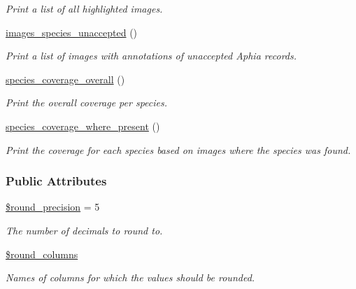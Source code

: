 \begin{DoxyCompactItemize}
\begin{DoxyCompactList}\small\item\em Print a list of all highlighted images. \end{DoxyCompactList}\item 
\hypertarget{classDataTable_a133de329decd44c977d5142ef1595803}{\hyperlink{classDataTable_a133de329decd44c977d5142ef1595803}{images\-\_\-species\-\_\-unaccepted} ()}\label{classDataTable_a133de329decd44c977d5142ef1595803}

\begin{DoxyCompactList}\small\item\em Print a list of images with annotations of unaccepted Aphia records. \end{DoxyCompactList}\item 
\hyperlink{classDataTable_a6cc56465dab08d3ee3056e8194763c59}{species\-\_\-coverage\-\_\-overall} ()
\begin{DoxyCompactList}\small\item\em Print the overall coverage per species. \end{DoxyCompactList}\item 
\hypertarget{classDataTable_a3b2e8e53c42632b99bedf359ea3d5632}{\hyperlink{classDataTable_a3b2e8e53c42632b99bedf359ea3d5632}{species\-\_\-coverage\-\_\-where\-\_\-present} ()}\label{classDataTable_a3b2e8e53c42632b99bedf359ea3d5632}

\begin{DoxyCompactList}\small\item\em Print the coverage for each species based on images where the species was found. \end{DoxyCompactList}\end{DoxyCompactItemize}
\subsubsection*{Public Attributes}
\begin{DoxyCompactItemize}
\item 
\hypertarget{classDataTable_af4fe165de0ec60acfa2f3d5846353e39}{\hyperlink{classDataTable_af4fe165de0ec60acfa2f3d5846353e39}{\$round\-\_\-precision} = 5}\label{classDataTable_af4fe165de0ec60acfa2f3d5846353e39}

\begin{DoxyCompactList}\small\item\em The number of decimals to round to. \end{DoxyCompactList}\item 
\hyperlink{classDataTable_a70af4121fabf49b5d01b9e77c059a6cc}{\$round\-\_\-columns}
\begin{DoxyCompactList}\small\item\em Names of columns for which the values should be rounded. \end{DoxyCompactList}\end{DoxyCompactItemize}


